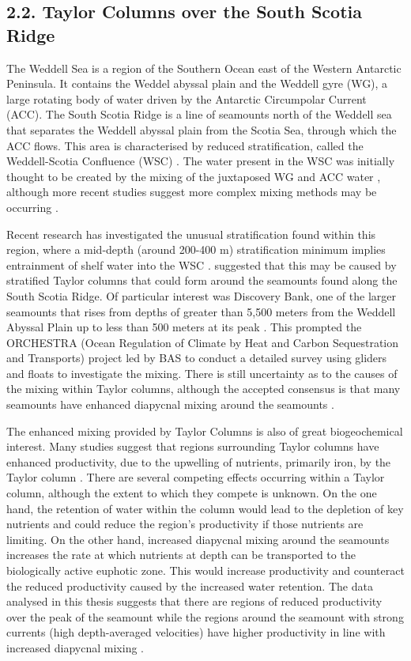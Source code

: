 \documentclass[
	a4paper, %
	10pt, %
	unnumberedsections, %
	twoside, %
]{LTJournalArticle}
\begin{document}
\begin{multicols}{2}
\subsection{2.2. Taylor Columns over the South Scotia Ridge}
The Weddell Sea is a region of the Southern Ocean east of the Western Antarctic Peninsula. It contains the Weddel abyssal
plain and the Weddell gyre (WG), a large rotating body of water driven by the Antarctic Circumpolar Current (ACC). The South
Scotia Ridge is a line of seamounts north of the Weddell sea that separates the Weddell abyssal plain from the Scotia Sea, through which the ACC flows. This
area is characterised by reduced stratification, called the Weddell-Scotia Confluence (WSC) \citep{ref29}. The water present in
the WSC was initially thought to be created by the mixing of the juxtaposed WG and ACC water \citep{ref30}, although more recent
studies suggest more complex mixing methods may be occurring \citep{ref2, ref30, ref31}.

Recent research has investigated the unusual stratification found within this region, where a mid-depth (around 200-400 m) stratification
minimum implies entrainment of shelf water into the WSC \citep{ref2, ref31}. \citet{ref30}
suggested that this may be caused by stratified Taylor columns that could form around the seamounts found along the South
Scotia Ridge. Of particular interest was Discovery Bank, one of the larger seamounts that rises from depths of greater than
5,500 meters from the Weddell Abyssal Plain up to less than 500 meters at its peak \citep{ref30}. This prompted the ORCHESTRA
(Ocean Regulation of Climate by Heat and Carbon Sequestration and Transports) project led by BAS to conduct a detailed survey
using gliders and floats to investigate the mixing. There is still uncertainty as to the causes of the mixing within Taylor
columns, although the accepted consensus is that many seamounts have enhanced diapycnal mixing around the seamounts \citep{ref2}. 

The enhanced mixing provided by Taylor Columns is also of great biogeochemical interest. Many studies
suggest that regions surrounding Taylor columns have enhanced productivity, due to the upwelling of nutrients, primarily iron, by
the Taylor column \citep{ref33, ref34, ref35, ref36}. There are several  competing effects occurring within a Taylor column, although the extent to
which they compete is unknown. On the one hand, the retention of water within the column would lead to the depletion of key
nutrients and could reduce the region’s productivity if those nutrients are limiting. On the other hand, increased diapycnal
mixing around the seamounts increases the rate at which nutrients at depth can be transported to the biologically active euphotic
zone. This would increase productivity and counteract the reduced productivity caused by the increased water retention. The data
analysed in this thesis suggests that there are regions of reduced productivity over the peak of the seamount while the regions
around the seamount with strong currents (high depth-averaged velocities) have higher productivity in line with increased
diapycnal mixing \citep{ref2}.\\


\end{multicols}
\end{document}
